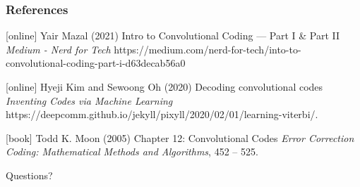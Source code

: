 \documentclass{beamer}
\newcommand{\<}				{\langle}
\renewcommand{\>}      		{\rangle}
\begin{document}
\begin{frame}
\frametitle{References}
\footnotesize{
\begin{thebibliography}{9} 

[online]
 Yair Mazal (2021)
\newblock Intro to Convolutional Coding — Part I \& Part II
\newblock \emph{Medium - Nerd for Tech} https://medium.com/nerd-for-tech/into-to-convolutional-coding-part-i-d63decab56a0

[online]
 Hyeji Kim and Sewoong Oh (2020)
\newblock Decoding convolutional codes
\newblock \emph{Inventing Codes via Machine Learning} https://deepcomm.github.io/jekyll/pixyll/2020/02/01/learning-viterbi/.

[book]
 Todd K. Moon (2005)
\newblock Chapter 12: Convolutional Codes
\newblock \emph{Error Correction Coding: Mathematical Methods and Algorithms}, 452 -- 525.

\end{thebibliography}
}
\end{frame}


\begin{frame}
\Huge{\centerline{Questions?}}
\end{frame}

\end{document}

